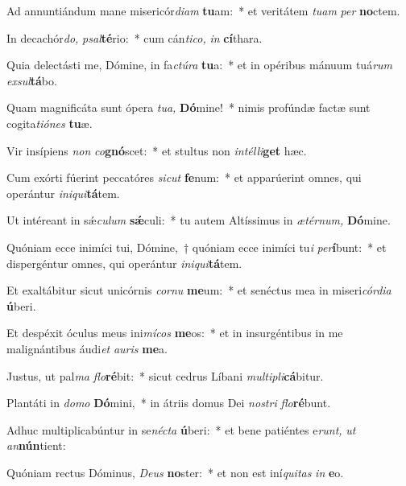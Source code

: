\item Ad annuntiándum mane misericór\textit{diam} \textbf{tu}am:~* et veritátem \textit{tuam} \textit{per} \textbf{no}ctem.
\item In decachór\textit{do,} \textit{psal}\textbf{té}rio:~* cum cán\textit{tico,} \textit{in} \textbf{cí}thara.
\item Quia delectásti me, Dómine, in fa\tinyhspace\textit{ctúra} \textbf{tu}a:~* et in opéribus mánuum tuá\tinyhspace\textit{rum} \textit{exsul}\textbf{tá}bo.
\item Quam magnificáta sunt ópera \textit{tua,} \textbf{Dó}mine!~* nimis profúndæ factæ sunt cogita\tinyhspace\textit{tiónes} \textbf{tu}æ.
\item Vir insípiens \textit{non} \textit{co}\textbf{gnó}scet:~* et stultus non \textit{intélli}\textbf{get} hæc.
\item Cum exórti fúerint peccatóres \textit{sicut} \textbf{fe}num:~* et apparúerint omnes, qui operántur \textit{iniqui}\textbf{tá}tem.
\item Ut intéreant in sǽ\tinyhspace\textit{culum} \textbf{sǽ}culi:~* tu autem Altíssimus in \textit{ætérnum,} \textbf{Dó}mine.
\item Quóniam ecce inimíci tui, Dómine,~† quóniam ecce inimíci tu\spurhspace\textit{i} \textit{per}\textbf{í}bunt:~* et dispergéntur omnes, qui operántur \textit{iniqui}\textbf{tá}tem.
\item Et exaltábitur sicut unicórnis \textit{cornu} \textbf{me}um:~* et senéctus mea in miseri\tinyhspace\textit{córdia} \textbf{ú}beri.
\item Et despéxit óculus meus ini\textit{mícos} \textbf{me}os:~* et in insurgéntibus in me malignántibus áudi\tinyhspace\textit{et} \textit{auris} \textbf{me}a.
\item Justus, ut pal\textit{ma} \textit{flo}\textbf{ré}bit:~* sicut cedrus Líbani \textit{multipli}\textbf{cá}bitur.
\item Plantáti in \textit{domo} \textbf{Dó}mini,~* in átriis domus Dei \textit{nostri} \textit{flo}\textbf{ré}bunt.
\item Adhuc multiplicabúntur in se\textit{nécta} \textbf{ú}beri:~* et bene patiéntes e\tinyhspace\textit{runt,} \textit{ut} \textit{an}\textbf{nún}tient:
\item Quóniam rectus Dóminus, \textit{Deus} \textbf{no}ster:~* et non est iní\tinyhspace\textit{quitas} \textit{in} \textbf{e}o.
